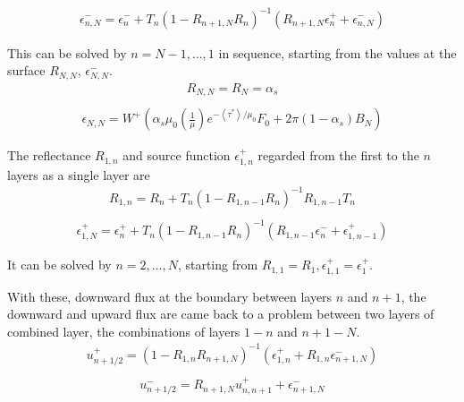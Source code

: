 \begin{equation}
\begin{array}{c}
\epsilon_{n, N}^{-}=\epsilon_{n}^{-}+T_{n}\left(1-R_{n+1, N} R_{n}\right)^{-1}\left(R_{n+1, N} \epsilon_{n}^{+}+\epsilon_{n, N}^{-}\right)
\end{array}
\end{equation}

This can be solved by \(n=N-1,\dots,1\) in sequence, starting from the
values at the surface \(R_{N, N}\), \(\epsilon_{N, N}^{-}\). \begin{equation}
\begin{array}{c}
R_{N, N}=R_{N}=\alpha_{s} \\
\end{array}
\end{equation} \begin{equation}
\begin{array}{c}
\epsilon_{N, N}=W^{+}\left(\alpha_{s} \mu_{0}\left(\frac{1}{\mu}\right) e^{-\left\langle\tau^{*}\right\rangle / \mu_{0}} F_{0}+2 \pi\left(1-\alpha_{s}\right) B_{N}\right)
\end{array}
\end{equation}

The reflectance \(R_{1, n}\) and source function \(\epsilon_{1, n}^{+}\)
regarded from the first to the \(n\) layers as a single layer are \begin{equation}
\begin{array}{c}
R_{1, n}=R_{n}+T_{n}\left(1-R_{1, n-1} R_{n}\right)^{-1} R_{1, n-1} T_{n} \\
\end{array}
\end{equation} \begin{equation}
\begin{array}{c}
\epsilon_{1, N}^{+}=\epsilon_{n}^{+}+T_{n}\left(1-R_{1, n-1} R_{n}\right)^{-1}\left(R_{1, n-1} \epsilon_{n}^{-}+\epsilon_{1, n-1}^{+}\right)
\end{array}
\end{equation}

It can be solved by \(n=2,\dots, N\), starting from
\(R_{1,1}=R_{1}, \epsilon_{1,1}^{+}=\epsilon_{1}^{+}\).

With these, downward flux at the boundary between layers \(n\) and
\(n+1\), the downward and upward flux are came back to a problem between
two layers of combined layer, the combinations of layers \(1-n\) and
\(n+1-N\). \begin{equation}
\begin{array}{c}
u_{n+1 / 2}^{+}=\left(1-R_{1, n} R_{n+1, N}\right)^{-1}\left(\epsilon_{1, n}^{+}+R_{1, n} \epsilon_{n+1, N}^{-}\right) \\
\end{array}
\end{equation} \begin{equation}
\begin{array}{c}
u_{n+1 / 2}^{-}=R_{n+1, N} u_{n, n+1}^{+}+\epsilon_{n+1, N}^{-}
\end{array}
\end{equation}

